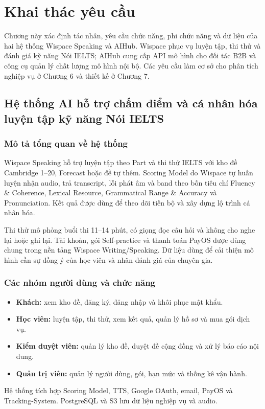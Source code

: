 \section{Khai thác yêu cầu}

Chương này xác định tác nhân, yêu cầu chức năng, phi chức năng và dữ liệu của hai hệ thống Wispace Speaking và AIHub. Wispace phục vụ luyện tập, thi thử và đánh giá kỹ năng Nói IELTS; AIHub cung cấp API mô hình cho đối tác B2B và công cụ quản lý chất lượng mô hình nội bộ. Các yêu cầu làm cơ sở cho phân tích nghiệp vụ ở Chương 6 và thiết kế ở Chương 7.

\subsection{Hệ thống AI hỗ trợ chấm điểm và cá nhân hóa luyện tập kỹ năng Nói IELTS}
\label{subsec:wispace_system_spec}

\subsubsection{Mô tả tổng quan về hệ thống}
Wispace Speaking hỗ trợ luyện tập theo Part và thi thử IELTS với kho đề Cambridge 1--20, Forecast hoặc đề tự thêm. Scoring Model do Wispace tự huấn luyện nhận audio, trả transcript, lỗi phát âm và band theo bốn tiêu chí Fluency \& Coherence, Lexical Resource, Grammatical Range \& Accuracy và Pronunciation. Kết quả được dùng để theo dõi tiến bộ và xây dựng lộ trình cá nhân hóa.

Thi thử mô phỏng buổi thi 11--14 phút, có giọng đọc câu hỏi và không cho nghe lại hoặc ghi lại. Tài khoản, gói Self-practice và thanh toán PayOS được dùng chung trong nền tảng Wispace Writing/Speaking. Dữ liệu dùng để cải thiện mô hình cần sự đồng ý của học viên và nhãn đánh giá của chuyên gia.

\subsubsection{Các nhóm người dùng và chức năng}
\begin{itemize}
\item \textbf{Khách:} xem kho đề, đăng ký, đăng nhập và khôi phục mật khẩu.
\item \textbf{Học viên:} luyện tập, thi thử, xem kết quả, quản lý hồ sơ và mua gói dịch vụ.
\item \textbf{Kiểm duyệt viên:} quản lý kho đề, duyệt đề cộng đồng và xử lý báo cáo nội dung.
\item \textbf{Quản trị viên:} quản lý người dùng, gói, hạn mức và thống kê vận hành.
\end{itemize}
Hệ thống tích hợp Scoring Model, TTS, Google OAuth, email, PayOS và Tracking-System. PostgreSQL và S3 lưu dữ liệu nghiệp vụ và audio.

